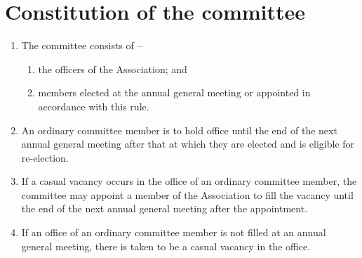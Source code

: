 \section{Constitution of the committee}
\label{rule:committeeConstitution}

\begin{enumerate}
	\item The committee consists of --
	\begin{enumerate}
		\item the officers of the Association; and
		\item \orgCommitteeExtras{} members elected at the annual general meeting or appointed in accordance with this rule.
	\end{enumerate}
	
	\item An ordinary committee member is to hold office until the end of the next annual general meeting after that at which they are elected and is eligible for re-election.
	\item If a casual vacancy occurs in the office of an ordinary committee member, the committee may appoint a member of the Association to fill the vacancy until the end of the next annual general meeting after the appointment.
	\item If an office of an ordinary committee member is not filled at an annual general meeting, there is taken to be a casual vacancy in the office.
\end{enumerate}